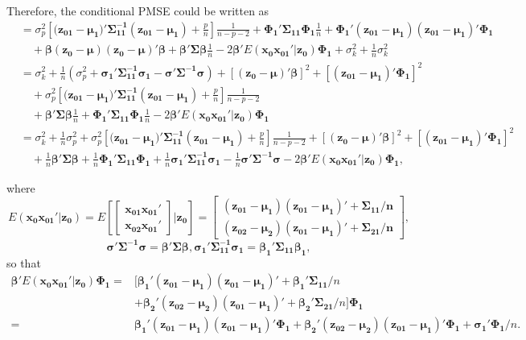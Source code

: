 Therefore, the conditional PMSE could be written as
$$\begin{aligned}
&=\sigma_p^2 \left[(\boldsymbol{z_{01}-\mu_1)'\Sigma_{11}^{-1}(z_{01}-\mu_1)}+\frac{p}{n}\right]\frac{1}{n-p-2}+\boldsymbol{\Phi_1'\Sigma_{11}\Phi_1}\frac{1}{n}+\boldsymbol{\Phi_{1}'(z_{01}-\mu_{1})(z_{01}-\mu_1)'\Phi_1}\\
&\quad+\boldsymbol{\beta}\boldsymbol{(z_0-\mu)(z_0-\mu)'\beta}+\boldsymbol{\beta'\Sigma}\boldsymbol{\beta}\frac{1}{n} -2\boldsymbol{\beta'}E(\boldsymbol{x_0x_{01}'}|\boldsymbol{z_0})\boldsymbol{\Phi_1}+\sigma_k^2+\frac{1}{n}\sigma_k^2\\
&=\sigma_k^2+\frac{1}{n}(\sigma_p^2+\boldsymbol{\sigma_1'\Sigma_{11}^{-1}\sigma_1-\sigma'\Sigma^{-1}\sigma})+[\boldsymbol{(z_{0}-\mu)'\beta}]^2+[\boldsymbol{(z_{01}-\mu_1)'\Phi_1}]^2\\
&\quad+\sigma_p^2 \left[(\boldsymbol{z_{01}-\mu_1)'\Sigma_{11}^{-1}(z_{01}-\mu_1)}+\frac{p}{n}\right]\frac{1}{n-p-2}\\
&\quad+\boldsymbol{\beta'\Sigma\beta}\frac{1}{n}+\boldsymbol{\Phi_1'\Sigma_{11}\Phi_1}\frac{1}{n}-2\boldsymbol{\beta'}E(\boldsymbol{x_0x_{01}'}|\boldsymbol{z_0})\boldsymbol{\Phi_1}\\
&=\sigma_k^2+\frac{1}{n}\sigma_p^2+\sigma_p^2 \left[(\boldsymbol{z_{01}-\mu_1)'\Sigma_{11}^{-1}(z_{01}-\mu_1)}+\frac{p}{n}\right]\frac{1}{n-p-2}
+[\boldsymbol{(z_{0}-\mu)'\beta}]^2+[\boldsymbol{(z_{01}-\mu_1)'\Phi_1}]^2\\
&\quad+\frac{1}{n}\boldsymbol{\beta'\Sigma\beta}+\frac{1}{n}\boldsymbol{\Phi_1'\Sigma_{11}\Phi_1}+\frac{1}{n}\boldsymbol{\sigma_1'\Sigma_{11}^{-1}\sigma_1}-\frac{1}{n}\boldsymbol{\sigma'\Sigma^{-1}\sigma}-2\boldsymbol{\beta'}E(\boldsymbol{x_0x_{01}'}|\boldsymbol{z_0})\boldsymbol{\Phi_1},
\end{aligned}$$

where $$E(\boldsymbol{x_0x_{01}'}|\boldsymbol{z_0})=E\left[\begin{bmatrix}
\boldsymbol{x_{01}x_{01}'}\\
\boldsymbol{x_{02}x_{01}'}
\end{bmatrix}|\boldsymbol{z_0}\right]=\begin{bmatrix}\boldsymbol{
(z_{01}-\mu_1)(z_{01}-\mu_1)'+\Sigma_{11}/n}\\
\boldsymbol{(z_{02}-\mu_2)(z_{01}-\mu_1)'+\Sigma_{21}/n}
\end{bmatrix},$$
$$\boldsymbol{\sigma'\Sigma^{-1}\sigma=\beta'\Sigma\beta}, \boldsymbol{\sigma_1'\Sigma_{11}^{-1}\sigma_1=\beta_1'\Sigma_{11}\beta_1},$$
so that
$$\begin{aligned}
\boldsymbol{\beta'}E(\boldsymbol{x_0x_{01}'}|\boldsymbol{z_0})\boldsymbol{\Phi_1}
=&[\boldsymbol{\beta_1'(z_{01}-\mu_1)(z_{01}-\mu_1)'+\beta_1'\Sigma_{11}}/n\\
&+\boldsymbol{\beta_2'(z_{02}-\mu_2)(z_{01}-\mu_1)'+\beta_2'\Sigma_{21}}/n]\boldsymbol{\Phi_1}\\
=&\boldsymbol{\beta_1'(z_{01}-\mu_1)(z_{01}-\mu_1)'\Phi_1}+\boldsymbol{\beta_2'(z_{02}-\mu_2)(z_{01}-\mu_1)'\Phi_1}+\boldsymbol{\sigma_1'\Phi_1}/n.\\
\end{aligned}$$

